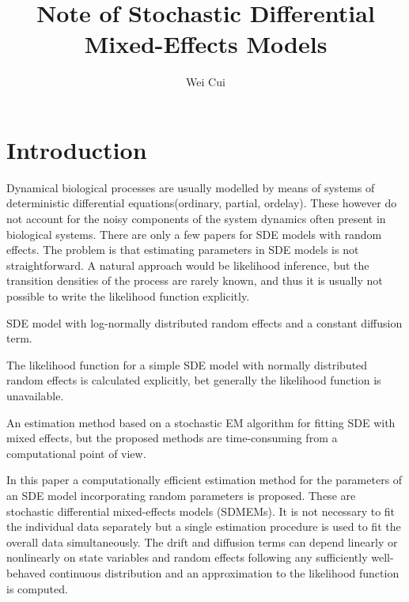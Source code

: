 \documentclass[12pt]{extarticle}
\title{Note of Stochastic Differential Mixed-Effects Models}
\author{Wei Cui}
\begin{document}
\maketitle
\section{Introduction}
Dynamical biological processes are usually modelled by means of systems of deterministic differential equations(ordinary, partial, ordelay). These however do not account for the noisy components of the system dynamics often present in biological systems.
There are only a few papers for SDE models with random effects. The problem is that estimating parameters in SDE models is not straightforward. A natural approach would be likelihood inference, but the transition densities of the process are rarely known, and thus it is usually not possible to write the likelihood function explicitly.

SDE model with log-normally distributed random effects and a constant diffusion term.\cite{Overgaard05,Tornoe05}

The likelihood function for a simple SDE model with normally distributed random effects is calculated explicitly\cite{Ditlevsen05}, bet generally the likelihood function is unavailable.

An estimation method based on a stochastic EM algorithm for fitting SDE with mixed effects\cite{Donnet08}, but the proposed methods are time-consuming from a computational point of view.

In this paper a computationally efficient estimation method for the parameters of an SDE model incorporating random parameters is proposed. These are stochastic differential mixed-effects models (SDMEMs). It is not necessary to fit the individual data separately but a single estimation procedure is used to fit the overall data simultaneously. The drift and diffusion terms can depend linearly or nonlinearly on state variables and random effects following any sufficiently well-behaved continuous distribution and an approximation to the likelihood function is computed.
\end{document}
